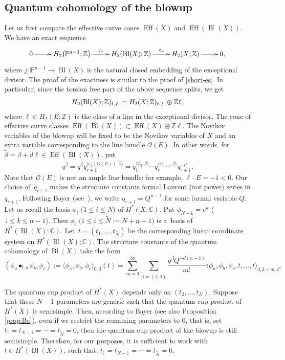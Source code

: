 \documentclass[10pt,a4paper]{article}
\numberwithin{equation}{section}
\newcommand{\CC}{\mathbb{C}}
\newcommand{\ZZ}{\mathbb{Z}}
\newcommand{\PP}{\mathbb{P}}
\renewcommand{\O}{\mathcal{O}}
\begin{document}
\subsection{Quantum cohomology of the blowup}\label{sec:qcoh_blowup}
Let us first compare the effective curve cones $\operatorname{Eff}(X)$
and $\operatorname{Eff}(\operatorname{Bl}(X)).$ We have an exact sequence
\[
\xymatrix{0\ar[r] &
 H_2\big(\PP^{n-1};\ZZ\big) \ar[r]^-{j_*} &
 H_2(\operatorname{Bl}(X);\ZZ) \ar[r]^-{\pi_*} &
 H_2(X;\ZZ)\ar[r] & 0,}
\]
where $j\colon \PP^{n-1}\to \operatorname{Bl}(X)$ is the natural closed
embedding of the exceptional divisor. The proof of the exactness is
similar to the proof of \eqref{short-es}. In particular, since the torsion
free part of the above sequence splits, we get
\[
H_2(\operatorname{Bl}(X);\ZZ)_{\rm t.f.} = H_2(X;\ZZ)_{\rm t.f.} \oplus
\ZZ \ell,
\]
where $\ell\in H_2(E;\ZZ)$ is the class of a line in the exceptional
divisor. The cone of effective curve classes
$\operatorname{Eff}(\operatorname{Bl}(X))\subset \operatorname{Eff}(X) \oplus
\ZZ \ell$. The Novikov variables of the blowup will be fixed to be
the Novikov variables of $X$ and an extra variable corresponding to
the line bundle $\O(E)$. In other words, for $\widetilde{\beta} = \beta+ d \ell \in
\operatorname{Eff}(\operatorname{Bl}(X))$, put
\[
q^{\widetilde{\beta}} =
q^\beta q_{r+1}^{\langle c_1(O(E)),\widetilde{\beta}\rangle}=
q_1^{\langle \phi_2,\beta\rangle}\cdots
q_r^{\langle \phi_{r+1},\beta\rangle}
q_{r+1}^{-d}.
\]
Note that $\O(E)$ is not an ample line bundle: for example,
$\ell\cdot E =-1<0$. Our choice of~$q_{r+1}$ makes the structure constants formal Laurent (not power) series in
$q_{r+1}$. Following Bayer (see~\cite{Ba}), we write $q_{r+1}=Q^{n-1}$
for some formal variable $Q$.
Let us recall the basis $\phi_i$ ($1\leq i\leq N$) of
$H^*(X;\CC)$. Put $\phi_{N+k} = e^k$ ($1\leq k\leq n-1$). Then
$\phi_i$ $\big(1\leq i\leq \widetilde{N}:=N+n-1\big)$ is a~basis of
$H^*(\operatorname{Bl}(X);\CC)$. Let~${t=(t_1,\dots,t_{\widetilde{N}})}$
be the corresponding linear coordinate system on
$H^*(\operatorname{Bl}(X);\CC)$.
The structure constants of the quantum cohomology of $\operatorname{Bl}(X)$
take the form
\[
(\phi_a\bullet_{t,q} \phi_b,\phi_c):=
\langle \phi_a, \phi_b,\phi_c\rangle_{0,3}(t) =
\sum_{m=0}^\infty
\sum_{\widetilde{\beta}=(\beta,d)}
\frac{q^\beta Q^{-d(n-1)}}{m!}
\langle
\phi_a,\phi_b,\phi_c,t,\dots,t\rangle_{0,3+m,\widetilde{\beta}}.
\]
\begin{Remark}
The quantum cup product of $H^*(X)$ depends only on
$(t_2,\dots,t_N)$. Suppose that these $N-1$ parameters are generic
such that the quantum cup product of $H^*(X)$ is semisimple. Then,
according to Bayer \cite{Ba} (see also Proposition \ref{prop:Ba}),
even if we restrict the remaining parameters to $0$, that is, set
$t_1=t_{N+1}=\cdots=t_{\widetilde{N}}=0$, then the quantum cup product
of the blowup is still semisimple. Therefore, for our purposes, it is
sufficient to work with $t\in H^*(\operatorname{Bl}(X))$, such that,
$t_1=t_{N+1}=\cdots=t_{\widetilde{N}}=0$.
\end{Remark}
\end{document}
